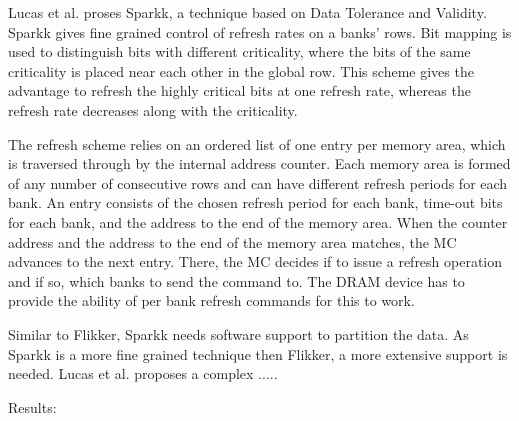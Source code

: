 Lucas et al. \cite{sparkk} proses Sparkk, a technique based on Data Tolerance and Validity. Sparkk gives fine grained control of refresh rates on a banks' rows. Bit mapping is used to distinguish bits with different criticality, where the bits of the same criticality is placed near each other in the global row. This scheme gives the advantage to refresh the highly critical bits at one refresh rate, whereas the refresh rate decreases along with the criticality. 

The refresh scheme relies on an ordered list of one entry per memory area, which is traversed through by the internal address counter. Each memory area is formed of any number of consecutive rows and can have different refresh periods for each bank. An entry consists of the chosen refresh period for each bank, time-out bits for each bank, and the address to the end of the memory area. When the counter address and the address to the end of the memory area matches, the MC advances to the next entry. There, the MC decides if to issue a refresh operation and if so, which banks to send the command to. The DRAM device has to provide the ability of per bank refresh commands for this to work. 


Similar to Flikker, Sparkk needs software support to partition the data. As Sparkk is a more fine grained technique then Flikker, a more extensive support is needed. Lucas et al. proposes a complex ..... 

Results:
